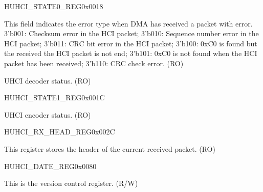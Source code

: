 \begin{register}{H}{UHCI\_STATE0\_REG}{0x0018}\label{regdesc:UHCISTATE0REG}
%
%
%
\regnewline%
\begin{regdesc}\begin{reglist}
\label{fielddesc:UHCIRXERRCAUSE}\item [UHCI\_RX\_ERR\_CAUSE] This field indicates the error type when DMA has received a packet with error.
3'b001: Checksum error in the HCI packet; 
3'b010: Sequence number error in the HCI packet;
3'b011: CRC bit error in the HCI packet;
3'b100: 0xC0 is found but the received the HCI packet is not end;
3'b101: 0xC0 is not found when the HCI packet has been received;
3'b110: CRC check error. (RO)
\label{fielddesc:UHCIDECODESTATE}\item [UHCI\_DECODE\_STATE] UHCI decoder status. (RO)
\end{reglist}\end{regdesc}
\end{register}


\begin{register}{H}{UHCI\_STATE1\_REG}{0x001C}\label{regdesc:UHCISTATE1REG}
%
%
\regnewline%
\begin{regdesc}\begin{reglist}
\label{fielddesc:UHCIENCODESTATE}\item [UHCI\_ENCODE\_STATE] UHCI encoder status. (RO)
\end{reglist}\end{regdesc}
\end{register}


\begin{register}{H}{UHCI\_RX\_HEAD\_REG}{0x002C}\label{regdesc:UHCIRXHEADREG}
%
\regnewline%
\begin{regdesc}\begin{reglist}
\label{fielddesc:UHCIRXHEAD}\item [UHCI\_RX\_HEAD] This register stores the header of the current received packet. (RO)
\end{reglist}\end{regdesc}
\end{register}


\begin{register}{H}{UHCI\_DATE\_REG}{0x0080}\label{regdesc:UHCIDATEREG}
%
\regnewline%
\begin{regdesc}\begin{reglist}
\label{fielddesc:UHCIDATE}\item [UHCI\_DATE] This is the version control register. (R/W)
\end{reglist}\end{regdesc}
\end{register}
